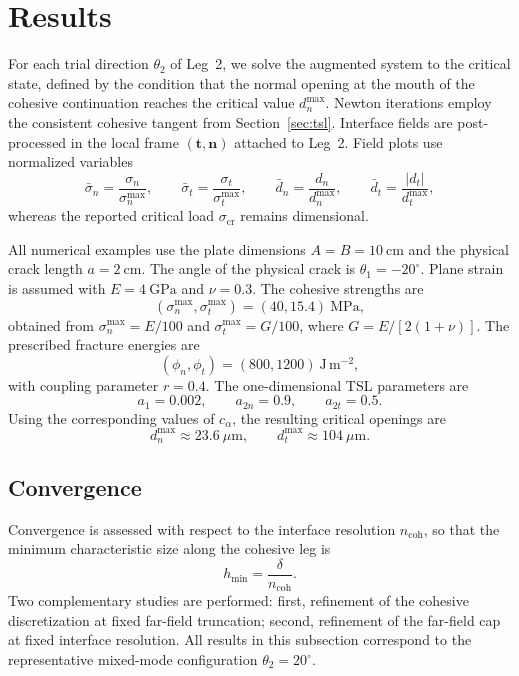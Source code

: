 \documentclass[smallextended]{svjour3}       %
\newcommand{\vb}[1]{\bm{#1}}      %
\newcommand{\tvec}{\vb{t}}
\newcommand{\nvec}{\vb{n}}
\providecommand{\bt}{\tvec}
\renewcommand{\bt}{\tvec}
\providecommand{\bn}{\nvec}
\renewcommand{\bn}{\nvec}
\begin{document}
\section{Results}
\label{sec:results}

For each trial direction \(\theta_2\) of Leg~2, we solve the augmented
system to the critical state, defined by the condition that the normal
opening at the mouth of the cohesive continuation reaches the critical
value \(d_n^{\max}\). Newton iterations employ the consistent cohesive
tangent from Section~\ref{sec:tsl}. Interface fields are post-processed in
the local frame \((\bt,\bn)\) attached to Leg~2. Field plots use normalized
variables
\[
\bar\sigma_n=\frac{\sigma_n}{\sigma_n^{\max}},
\qquad
\bar\sigma_t=\frac{\sigma_t}{\sigma_t^{\max}},
\qquad
\bar d_n=\frac{d_n}{d_n^{\max}},
\qquad
\bar d_t=\frac{|d_t|}{d_t^{\max}},
\]
whereas the reported critical load \(\sigma_{\mathrm{cr}}\) remains
dimensional.

All numerical examples use the plate dimensions
\(A=B=10~\mathrm{cm}\) and the physical crack length \(a=2~\mathrm{cm}\).
The angle of the physical crack is \(\theta_1=-20^\circ\). Plane strain is
assumed with \(E=4~\mathrm{GPa}\) and \(\nu=0.3\). The cohesive strengths
are
\[
(\sigma_n^{\max},\sigma_t^{\max})=(40,15.4)~\mathrm{MPa},
\]
obtained from \(\sigma_n^{\max}=E/100\) and
\(\sigma_t^{\max}=G/100\), where \(G=E/[2(1+\nu)]\). The prescribed
fracture energies are
\[
(\phi_n,\phi_t)=(800,1200)~\mathrm{J\,m^{-2}},
\]
with coupling parameter \(r=0.4\). The one-dimensional TSL parameters are
\[
a_1=0.002,
\qquad
a_{2n}=0.9,
\qquad
a_{2t}=0.5.
\]
Using the corresponding values of \(c_\alpha\), the resulting critical
openings are
\[
d_n^{\max}\approx 23.6~\mu\mathrm{m},
\qquad
d_t^{\max}\approx 104~\mu\mathrm{m}.
\]

\subsection{Convergence}

Convergence is assessed with respect to the interface resolution
\(n_{\mathrm{coh}}\), so that the minimum characteristic size along the
cohesive leg is
\[
h_{\min}=\frac{\delta}{n_{\mathrm{coh}}}.
\]
Two complementary studies are performed: first, refinement of the cohesive
discretization at fixed far-field truncation; second, refinement of the
far-field cap at fixed interface resolution. All results in this subsection
correspond to the representative mixed-mode configuration
\(\theta_2=20^\circ\).
\end{document}
